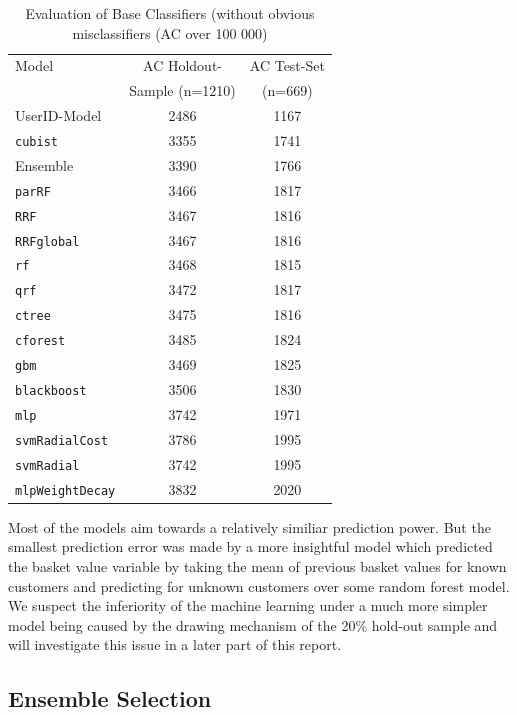 \documentclass[12pt]{article}
\begin{document}
\begin{table}
\centering
\begin{tabular}{l|cc}
\hline
\hline
Model & AC Holdout- &AC Test-Set \\
& Sample (n=1210)  &  (n=669) \\\hline
UserID-Model & 2486 & 1167 \\
\texttt{cubist} & 3355 & 1741\\
Ensemble & 3390 & 1766 \\
\texttt{parRF} & 3466 & 1817 \\
\texttt{RRF} & 3467 & 1816\\
\texttt{RRFglobal} & 3467 & 1816\\
\texttt{rf} & 3468 & 1815\\
\texttt{qrf} & 3472 & 1817\\
\texttt{ctree} & 3475 & 1816\\
\texttt{cforest} & 3485 & 1824\\
\texttt{gbm }& 3469 & 1825\\
\texttt{blackboost} & 3506 & 1830\\
\texttt{mlp} & 3742 & 1971\\
\texttt{svmRadialCost} & 3786 & 1995\\
\texttt{svmRadial} & 3742 & 1995\\
\texttt{mlpWeightDecay} & 3832 & 2020\\
\hline
\hline
\end{tabular}
\caption{Evaluation of Base Classifiers (without obvious misclassifiers (AC over 100 000)}
\end{table}

Most of the models aim towards a relatively similiar prediction power. But the smallest prediction error was made by a more insightful model which predicted the basket value variable by taking the mean of previous basket values for known customers and predicting for unknown customers over some random forest model. 
We suspect the inferiority of the machine learning under a much more simpler model being caused by the drawing mechanism of the 20\% hold-out sample and will investigate this issue in a later part of this report.



\subsection{Ensemble Selection}
\end{document}
